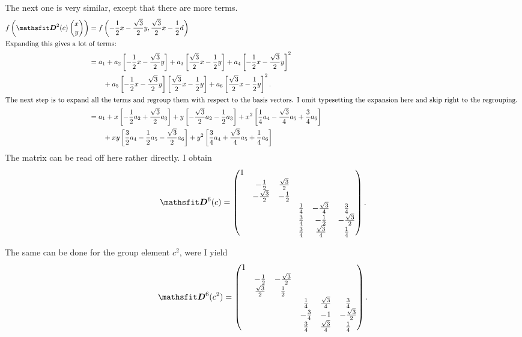 \documentclass[11pt, english, fleqn, DIV=15, headinclude, BCOR=1cm]{scrartcl}
\begin{document}
The next one is very similar, except that there are more terms.
\begin{align*}
    f\del{\tens D^2(c) \begin{pmatrix}
        x \\ y
    \end{pmatrix}}
    &= f\del{- \frac12 x - \frac{\sqrt3}2 y, \frac{\sqrt 3}2 x - \frac12 d} \\
    \intertext{%
        Expanding this gives a lot of terms:
    }
    &= a_1 + a_2 \sbr{- \frac12 x - \frac{\sqrt 3}{2} y} + a_3 \sbr{\frac{\sqrt
    3}2 x - \frac 12 y} + a_4 \sbr{- \frac 12 x - \frac{\sqrt 3}2 y}^2 \\&\qquad + a_5 \sbr{-
    \frac12 x - \frac{\sqrt 3}2 y} \sbr{\frac{\sqrt 3}2 x - \frac12 y} + a_6
    \sbr{\frac{\sqrt{3}}2 x - \frac 12 y}^2. \\
    \intertext{%
        The next step is to expand all the terms and regroup them with respect
        to the basis vectors. I omit typesetting the expansion here and skip
        right to the regrouping.
    }
    &= a_1 + x\sbr{- \frac12 a_2 + \frac{\sqrt 3}2 a_3} + y \sbr{-\frac{\sqrt
    3}2 a_2 - \frac12 a_3} + x^2 \sbr{\frac14 a_4 - \frac{\sqrt 3}4 a_5 + \frac 34
    a_6} \\&\qquad + xy \sbr{\frac32 a_4 - \frac12 a_5 - \frac{\sqrt 3}2 a_6} + y^2
    \sbr{\frac 34 a_4 + \frac{\sqrt 3}4 a_5 + \frac 14 a_6}
\end{align*}
The matrix can be read off here rather directly. I obtain
\[
    \tens D^6(c) =
    \begin{pmatrix}
        1 & & & & & \\
          & -\frac12 & \frac{\sqrt 3}2 & & & \\
          & - \frac{\sqrt 3}2 & -\frac12 & & & \\
          & & & \frac 14 & - \frac{\sqrt{3}}4 & \frac34 \\
          & & & \frac34 & - \frac12 & - \frac{\sqrt 3}2 \\
          & & & \frac34 & \frac{\sqrt 3}4 & \frac 14
    \end{pmatrix}.
\]

The same can be done for the group element $c^2$, were I yield
\[
    \tens D^6(c^2) =
    \begin{pmatrix}
        1 & & & & & \\
          & -\frac12 & -\frac{\sqrt 3}2 & & & \\
          & \frac{\sqrt 3}2 & \frac12 & & & \\
          & & & \frac 14 & \frac{\sqrt{3}}4 & \frac34 \\
          & & & -\frac34 & -1 & - \frac{\sqrt 3}2 \\
          & & & \frac34 & \frac{\sqrt 3}4 & \frac 14
    \end{pmatrix}.
\]
\end{document}
